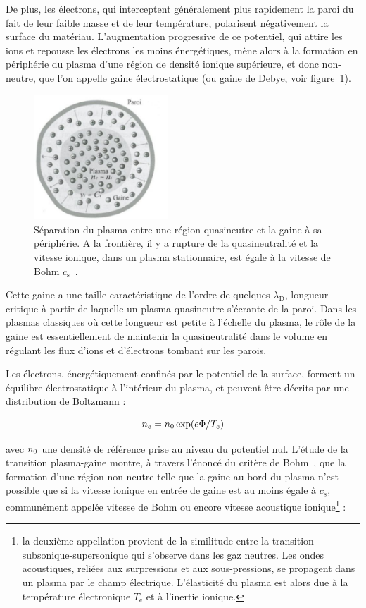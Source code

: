 \begin{refsection}
De plus, les électrons, qui interceptent généralement
plus rapidement la paroi du fait de leur faible masse et de leur température,
polarisent négativement la surface du matériau.
L'augmentation progressive de ce potentiel, qui attire les ions et repousse les
électrons les moins énergétiques, mène alors à la formation en périphérie du
plasma d'une région de densité ionique supérieure, et donc non-neutre, que l'on
appelle gaine électrostatique (ou gaine de Debye, voir figure~\ref{1-gaine1}).

\begin{figure}[htbp]
\centering
\includegraphics[width=0.45\textwidth]{figures/1-sheath.jpg}{\caption{Séparation
du plasma entre une région quasineutre et la gaine à sa
périphérie. A la frontière, il y a rupture de la quasineutralité et la vitesse
ionique, dans un plasma stationnaire, est égale à la vitesse de Bohm
$c_\text{s}$~\parencite{Rax}.}\label{1-gaine1}}
\end{figure}

Cette gaine a une taille caractéristique de l'ordre de quelques
$\lambda_\text{D}$, longueur critique à partir de laquelle un plasma
quasineutre s'écrante de la paroi. Dans les plasmas classiques où cette longueur
est petite à l'échelle du plasma, le rôle de la gaine est essentiellement de
maintenir la quasineutralité dans le volume en régulant les flux d'ions et
d'électrons tombant sur les parois. 

Les électrons, énergétiquement confinés
par le potentiel de la surface, forment un équilibre électrostatique à l'intérieur du
plasma, et peuvent être décrits par une distribution de Boltzmann :

\begin{equation}
	n_{e}=n{_{0}}\exp(e\Phi/T_{e})
\end{equation}

avec $n{_{0}}$ une densité de référence prise au niveau du potentiel nul.
L'étude de la transition plasma-gaine montre,
à travers l'énoncé du critère de Bohm~\parencite{Stangeby}, que
la formation d'une région non neutre telle que la gaine au bord du plasma n'est
possible que si la vitesse ionique en entrée de gaine est au moins égale à
$c_s$, communément appelée vitesse de Bohm ou encore vitesse acoustique
ionique\footnote{la deuxième appellation provient de la similitude entre la
transition subsonique-supersonique qui s'observe dans les gaz neutres. Les
ondes acoustiques, reliées aux surpressions et aux sous-pressions, se propagent
dans un plasma par le champ électrique. L'élasticité du plasma est alors due à
la température électronique $T_\text{e}$ et à l'inertie ionique.} :


\end{refsection}
